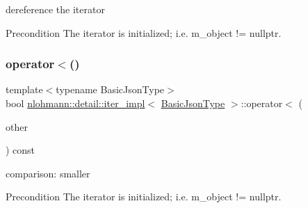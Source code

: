 dereference the iterator 

\begin{DoxyPrecond}{Precondition}
The iterator is initialized; i.\+e. {\ttfamily m\+\_\+object != nullptr}. 
\end{DoxyPrecond}
\mbox{\label{classnlohmann_1_1detail_1_1iter__impl_a0d14cd76203e00bdcef6a64a5d055cc7}} 
\subsubsection{\texorpdfstring{operator$<$()}{operator<()}}
{\footnotesize\ttfamily template$<$typename Basic\+Json\+Type$>$ \\
bool \hyperlink{classnlohmann_1_1detail_1_1iter__impl}{nlohmann\+::detail\+::iter\+\_\+impl}$<$ \hyperlink{classnlohmann_1_1detail_1_1iter__impl_abf18f18793f84b0222aebb5a2a87da7a}{Basic\+Json\+Type} $>$\+::operator$<$ (\begin{DoxyParamCaption}\item[{const \hyperlink{classnlohmann_1_1detail_1_1iter__impl}{iter\+\_\+impl}$<$ \hyperlink{classnlohmann_1_1detail_1_1iter__impl_abf18f18793f84b0222aebb5a2a87da7a}{Basic\+Json\+Type} $>$ \&}]{other }\end{DoxyParamCaption}) const\hspace{0.3cm}{\ttfamily [inline]}}



comparison\+: smaller 

\begin{DoxyPrecond}{Precondition}
The iterator is initialized; i.\+e. {\ttfamily m\+\_\+object != nullptr}. 
\end{DoxyPrecond}
\mbox{\label{classnlohmann_1_1detail_1_1iter__impl_ac6f71b36d7c87e427d1fee83f2600fad}} 
